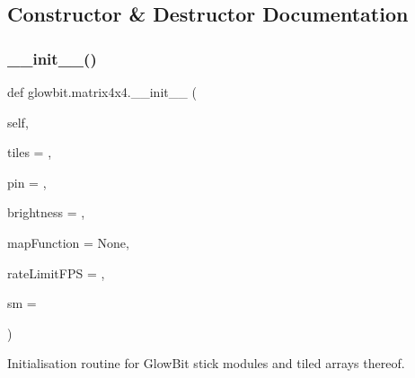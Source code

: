 \subsection{Constructor \& Destructor Documentation}
\mbox{\label{classglowbit_1_1matrix4x4_a9a9f870a9505b2a4e27519a8e279e81c}} 
\subsubsection{\texorpdfstring{\+\_\+\+\_\+init\+\_\+\+\_\+()}{\_\_init\_\_()}}
{\footnotesize\ttfamily def glowbit.\+matrix4x4.\+\_\+\+\_\+init\+\_\+\+\_\+ (\begin{DoxyParamCaption}\item[{}]{self,  }\item[{}]{tiles = {},  }\item[{}]{pin = {},  }\item[{}]{brightness = {},  }\item[{}]{map\+Function = {\ttfamily None},  }\item[{}]{rate\+Limit\+F\+PS = {},  }\item[{}]{sm = {} }\end{DoxyParamCaption})}



Initialisation routine for Glow\+Bit stick modules and tiled arrays thereof. 


